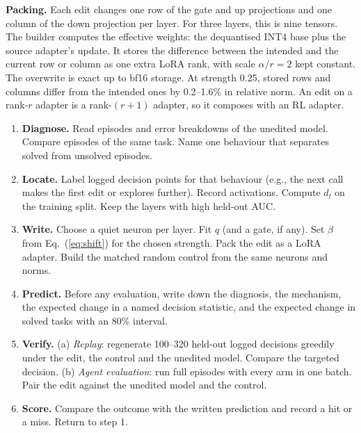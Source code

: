 \textbf{Packing.} Each edit changes one row of the gate and up projections and one column of the down projection per layer. For three layers, this is nine tensors. The builder computes the effective weights: the dequantised INT4 base plus the source adapter's update. It stores the difference between the intended and the current row or column as one extra LoRA rank, with scale $\alpha / r = 2$ kept constant. The overwrite is exact up to bf16 storage. At strength 0.25, stored rows and columns differ from the intended ones by 0.2--1.6\% in relative norm. An edit on a rank-$r$ adapter is a rank-$(r{+}1)$ adapter, so it composes with an RL adapter.

\begin{algorithm}[h]
\caption{Weight-programming loop (one iteration). Steps 1--4 run on CPU; step 5 (replay and agent evaluation) uses a GPU.}
\label{alg:loop}
\small
\begin{enumerate}[leftmargin=1.8em]
    \item \textbf{Diagnose.} Read episodes and error breakdowns of the unedited model. Compare episodes of the same task. Name one behaviour that separates solved from unsolved episodes.
    \item \textbf{Locate.} Label logged decision points for that behaviour (e.g., the next call makes the first edit or explores further). Record activations. Compute $d_l$ on the training split. Keep the layers with high held-out AUC.
    \item \textbf{Write.} Choose a quiet neuron per layer. Fit $q$ (and a gate, if any). Set $\beta$ from Eq.~(\ref{eq:shift}) for the chosen strength. Pack the edit as a LoRA adapter. Build the matched random control from the same neurons and norms.
    \item \textbf{Predict.} Before any evaluation, write down the diagnosis, the mechanism, the expected change in a named decision statistic, and the expected change in solved tasks with an 80\% interval.
    \item \textbf{Verify.} (a) \emph{Replay}: regenerate 100--320 held-out logged decisions greedily under the edit, the control and the unedited model. Compare the targeted decision. (b) \emph{Agent evaluation}: run full episodes with every arm in one batch. Pair the edit against the unedited model and the control.
    \item \textbf{Score.} Compare the outcome with the written prediction and record a hit or a miss. Return to step 1.
\end{enumerate}
\end{algorithm}

